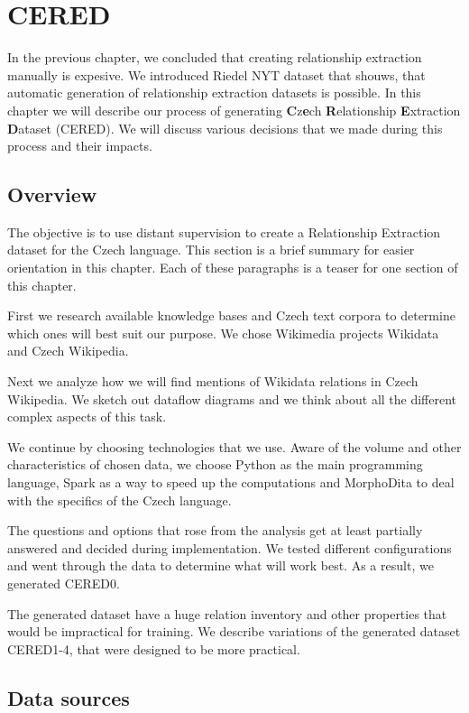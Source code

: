 \chapter{CERED}

In the previous chapter, we concluded that creating relationship extraction manually is expesive. We introduced Riedel NYT dataset that shouws, that automatic generation of relationship extraction datasets is possible. In this chapter we will describe our process of generating \textbf{C}z\textbf{e}ch \textbf{R}elationship \textbf{E}xtraction \textbf{D}ataset (CERED). We will discuss various decisions that we made during this process and their impacts.


\section{Overview}

The objective is to use distant supervision to create a Relationship Extraction dataset for the Czech language. This section is a brief summary for easier orientation in this chapter. Each of these paragraphs is a teaser for one section of this chapter.

First we research available knowledge bases and Czech text corpora to determine which ones will best suit our purpose. We chose Wikimedia projects Wikidata and Czech Wikipedia.

Next we analyze how we will find mentions of Wikidata relations in Czech Wikipedia. We sketch out dataflow diagrams and we think about all the different complex aspects of this task.

We continue by choosing technologies that we use. Aware of the volume and other characteristics of chosen data, we choose Python as the main programming language, Spark as a way to speed up the computations and MorphoDita to deal with the specifics of the Czech language.

The questions and options that rose from the analysis get at least partially answered and decided during implementation. We tested different configurations and went through the data to determine what will work best. As a result, we generated CERED0.

The generated dataset have a huge relation inventory and other properties that would be impractical for training. We describe variations of the generated dataset CERED1-4, that were designed to be more practical.



\section{Data sources}

